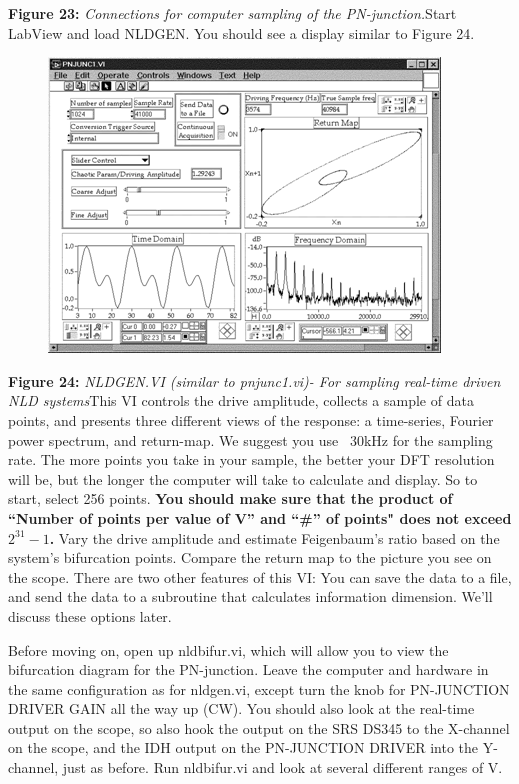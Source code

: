 \documentclass{../lab}
\begin{document}
\textbf{Figure 23:} \emph{Connections for computer sampling of the PN-junction.}Start LabView and load NLDGEN. You should see a display similar to Figure 24.


\begin{figure}[h]
    \centering
    \href{http://experimentationlab.berkeley.edu/sites/default/files/images/Nldimage128.gif}{\includegraphics[width=0.5\linewidth]{images/Nldimage128.png}}
    \caption{}
    \label{fig:Nldimage128}
\end{figure}

\textbf{Figure 24:} \emph{NLDGEN.VI (similar to pnjunc1.vi)- For sampling real-time driven NLD systems}This VI controls the drive amplitude, collects a sample of data points, and presents three different views of the response: a time-series, Fourier power spectrum, and return-map. We suggest you use ~30kHz for the sampling rate. The more points you take in your sample, the better your DFT resolution will be, but the longer the computer will take to calculate and display. So to start, select 256 points. \textbf{You should make sure that the product of ``Number of points per value of V'' and ``\#'' of points" does not exceed $ 2^{31}-1 $.}  Vary the drive amplitude and estimate Feigenbaum's ratio based on the system's bifurcation points. Compare the return map to the picture you see on the scope. There are two other features of this VI: You can save the data to a file, and send the data to a subroutine that calculates information dimension. We'll discuss these options later.

Before moving on, open up nldbifur.vi, which will allow you to view the bifurcation diagram for the PN-junction. Leave the computer and hardware in the same configuration as for nldgen.vi, except turn the knob for PN-JUNCTION DRIVER GAIN all the way up (CW). You should also look at the real-time output on the scope, so also hook the output on the SRS DS345 to the X-channel on the scope, and the IDH output on the PN-JUNCTION DRIVER into the Y-channel, just as before. Run nldbifur.vi and look at several different ranges of V.
\end{document}
